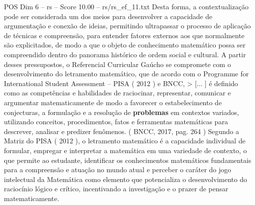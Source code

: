 \begin{textsample}{POS Dim 6 – rs – Score 10.00 – rs/rs\_ef\_11.txt}
Desta forma, a contextualização pode ser considerada um dos meios para desenvolver a capacidade de argumentação e conexão de ideias, permitindo ultrapassar o processo de aplicação de técnicas e compreensão, para entender fatores externos aos que normalmente são explicitados, de modo a que o objeto de conhecimento matemático possa ser compreendido dentro do panorama histórico de ordem social e cultural.
A partir desses pressupostos, o Referencial Curricular Gaúcho se compromete com o desenvolvimento do letramento matemático, que de acordo com o Programme for International Student Assessment – PISA ( 2012 ) e BNCC, > [... ] é definido como as competências e habilidades de raciocinar, representar, comunicar e argumentar matematicamente de modo a favorecer o estabelecimento de conjecturas, a formulação e a resolução de \textbf{problemas} em contextos variados, utilizando conceitos, procedimentos, fatos e ferramentas matemáticas para descrever, analisar e predizer fenômenos. ( BNCC, 2017, pag. 264 ) Segundo a Matriz do PISA ( 2012 ), o letramento matemático é a capacidade individual de formular, empregar e interpretar a matemática em uma variedade de contexto, o que permite ao estudante, identificar os conhecimentos matemáticos fundamentais para a compreensão e atuação no mundo atual e perceber o caráter do jogo intelectual da Matemática como elemento que potencializa o desenvolvimento do raciocínio lógico e crítico, incentivando a investigação e o prazer de pensar matematicamente.

\end{textsample}
